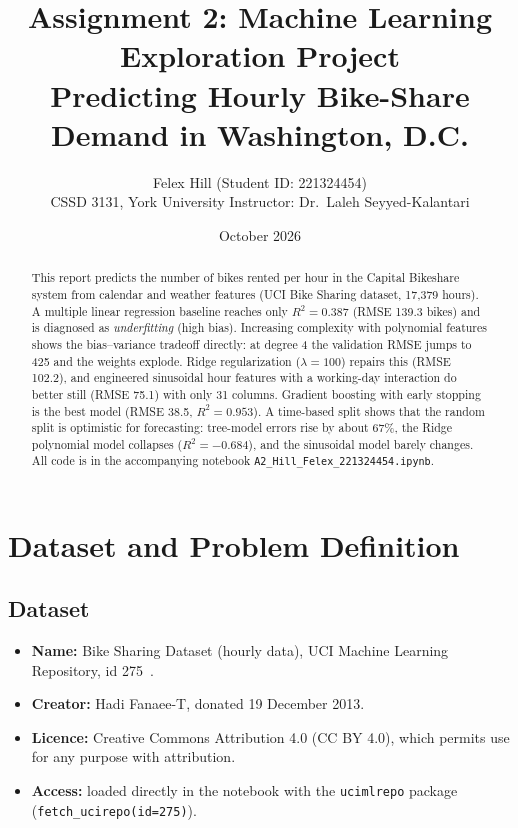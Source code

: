 \documentclass[11pt]{article}
\title{\textbf{Assignment 2: Machine Learning Exploration Project}\\[4pt]
\large Predicting Hourly Bike-Share Demand in Washington, D.C.}
\author{Felex Hill \quad (Student ID: 221324454)\\[2pt]
CSSD 3131, York University \quad Instructor: Dr.\ Laleh Seyyed-Kalantari}
\date{October 2026}
\newcommand{\code}[1]{\texttt{#1}}
\begin{document}
\maketitle

\begin{abstract}
\noindent
This report predicts the number of bikes rented per hour in the Capital Bikeshare system
from calendar and weather features (UCI Bike Sharing dataset, 17,379 hours). A multiple
linear regression baseline reaches only $R^2 = 0.387$ (RMSE 139.3 bikes) and is diagnosed as
\emph{underfitting} (high bias). Increasing complexity with polynomial features shows the
bias--variance tradeoff directly: at degree 4 the validation RMSE jumps to 425 and the weights
explode. Ridge regularization ($\lambda = 100$) repairs this (RMSE 102.2), and engineered
sinusoidal hour features with a working-day interaction do better still (RMSE 75.1) with only
31 columns. Gradient boosting with early stopping is the best model (RMSE 38.5, $R^2 = 0.953$).
A time-based split shows that the random split is optimistic for forecasting: tree-model errors
rise by about 67\%, the Ridge polynomial model collapses ($R^2 = -0.684$), and the sinusoidal
model barely changes. All code is in the accompanying notebook \code{A2\_Hill\_Felex\_221324454.ipynb}.
\end{abstract}

\tableofcontents
\newpage

\section{Dataset and Problem Definition}

\subsection{Dataset}

\begin{itemize}
  \item \textbf{Name:} Bike Sharing Dataset (hourly data), UCI Machine Learning Repository, id 275~\cite{uci,fanaee}.
  \item \textbf{Creator:} Hadi Fanaee-T, donated 19 December 2013.
  \item \textbf{Licence:} Creative Commons Attribution 4.0 (CC BY 4.0), which permits use for any purpose with attribution.
  \item \textbf{Access:} loaded directly in the notebook with the \code{ucimlrepo} package (\code{fetch\_ucirepo(id=275)}).
\end{itemize}
\end{document}
